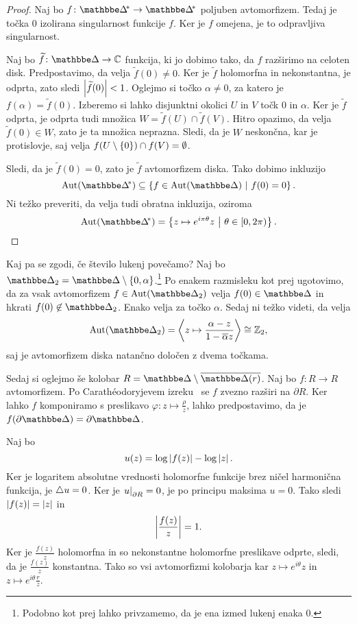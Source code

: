 \begin{proof}
Naj bo $f \colon \dskx \to \dskx$ poljuben avtomorfizem. Tedaj je
točka $0$ izolirana singularnost funkcije $f$. Ker je $f$ omejena,
je to odpravljiva singularnost.

Naj bo $\widetilde{f} \colon \dsk \to \C$ funkcija, ki jo dobimo
tako, da $f$ razširimo na celoten disk. Predpostavimo, da velja
$\widetilde{f}(0) \ne 0$. Ker je $\widetilde{f}$ holomorfna in
nekonstantna, je odprta, zato sledi $\left\lvert \widetilde{f}(0)\right\rvert < 1$.
Oglejmo si točko $\alpha \ne 0$, za katero je
$f(\alpha) = \widetilde{f}(0)$. Izberemo si lahko disjunktni
okolici $U$ in $V$ točk $0$ in $\alpha$. Ker je $\widetilde{f}$
odprta, je odprta tudi množica
$W = \widetilde{f}(U) \cap \widetilde{f}(V)$. Hitro opazimo, da
velja $\widetilde{f}(0) \in W$, zato je ta množica neprazna.
Sledi, da je $W$ neskončna, kar je protislovje, saj velja
$f(U \setminus \left\{0\right\}) \cap f(V) = \emptyset$.

Sledi, da je $\widetilde{f}(0) = 0$, zato je $\widetilde{f}$
avtomorfizem diska. Tako dobimo inkluzijo
\[
\Aut(\dskx) \subseteq \setb{f \in \Aut(\dsk)}{f(0) = 0}.
\]
Ni težko preveriti, da velja tudi obratna inkluzija, oziroma
\[
\Aut(\dskx) =
\setb{z \mapsto e^{i \pi \theta} z}{\theta \in [0, 2\pi)}.
\qedhere
\]
\end{proof}

Kaj pa se zgodi, če število lukenj povečamo? Naj bo
$\dsk_2 = \dsk \setminus \set{0, \alpha}$.\footnote{Podobno kot
prej lahko privzamemo, da je ena izmed lukenj enaka $0$.} Po
enakem razmisleku kot prej ugotovimo, da za vsak avtomorfizem
$f \in \Aut(\dsk_2)$ velja $f(0) \in \dsk$ in hkrati
$f(0) \not \in \dsk_2$. Enako velja za točko $\alpha$. Sedaj ni
težko videti, da velja
\[
\Aut(\dsk_2) =
\skl{z \mapsto \frac{\alpha - z}{1 - \oline{\alpha} z}} \cong
\Z_2,
\]
saj je avtomorfizem diska natančno določen z dvema točkama.

Sedaj si oglejmo še kolobar $R = \dsk \setminus \oline{\dsk(r)}$.
Naj bo $f \colon R \to R$ avtomorfizem. Po Carathéodoryjevem
izreku~\cite[izrek~5.1.1 in opomba~5.1.2]{krantz} se $f$ zvezno
razširi na $\partial R$. Ker lahko $f$ komponiramo s preslikavo
$\varphi \colon z \mapsto \frac{\rho}{z}$, lahko predpostavimo, da
je $f(\partial \dsk) = \partial \dsk$.

Naj bo
\[
u(z) = \log \left\lvert f(z)\right\rvert - \log \left\lvert z\right\rvert.
\]
Ker je logaritem absolutne vrednosti holomorfne funkcije brez ničel
harmonična funkcija, je $\mathop{}\!\mathbin\bigtriangleup u = 0$. Ker je
$\left. u\right|_{\partial R}^{} = 0$, je po principu maksima $u = 0$. Tako
sledi $\left\lvert f(z)\right\rvert = \left\lvert z\right\rvert$ in
\[
\left\lvert \frac{f(z)}{z}\right\rvert = 1.
\]
Ker je $\frac{f(z)}{z}$ holomorfna in so nekonstantne holomorfne
preslikave odprte, sledi, da je $\frac{f(z)}{z}$ konstantna. Tako
so vsi avtomorfizmi kolobarja kar $z \mapsto e^{i \theta} z$ in
$z \mapsto e^{i \theta} \frac{r}{z}$.

